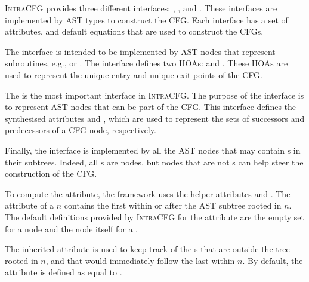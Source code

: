 \textsc{IntraCFG} provides three different interfaces: 
, , and .
These interfaces are implemented by AST types to construct the CFG.
Each interface has a set of attributes, and default equations that are used to
construct the CFGs.

The  interface is intended to be implemented by AST nodes that represent
subroutines, e.g.,  or .
The  interface defines two HOAs:  and
. These HOAs are used to represent the unique entry and unique exit points
of the CFG.

The  is the most important interface in \textsc{IntraCFG}.
The purpose of the  interface is to represent AST nodes that can 
be part of the CFG. This interface defines the synthesised
attributes  and , which are used to
represent the sets of successors and predecessors of a CFG node, respectively.


Finally, the  interface is implemented by all the AST nodes that may 
contain s in their subtrees. Indeed, all s are  
nodes, but  nodes that are not s can 
help steer the construction of the CFG.

To compute the  attribute, the framework uses the helper 
attributes  and . The 
 attribute of a  $n$ 
contains the first  within or after 
the AST subtree rooted in $n$.
The default definitions provided by \textsc{IntraCFG} for the  
attribute are the empty set for a  node and the node itself 
for a .

The inherited attribute  is used to keep track of the 
s that are outside the tree rooted in $n$, and that would immediately follow the 
last  within $n$. 
By default, the  attribute is defined as equal to .


